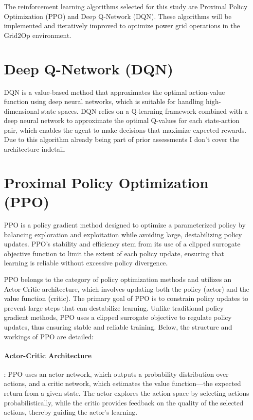\documentclass[
12pt, %
oneside, %
english, %
onehalfspacing, %
nolistspacing, %
liststotoc, %
headsepline, %
]{ProposalAndThesis} %
\begin{document}
The reinforcement learning algorithms selected for this study are Proximal Policy Optimization (PPO) and Deep Q-Network (DQN). These algorithms will be implemented and iteratively improved to optimize power grid operations in the Grid2Op environment.

\section{Deep Q-Network (DQN)}
DQN is a value-based method that approximates the optimal action-value function using deep neural networks, which is suitable for handling high-dimensional state spaces. DQN relies on a Q-learning framework combined with a deep neural network to approximate the optimal Q-values for each state-action pair, which enables the agent to make decisions that maximize expected rewards. Due to this algorithm already being part of prior assessments I don't cover the architecture indetail.

\section{Proximal Policy Optimization (PPO)}
PPO is a policy gradient method designed to optimize a parameterized policy by balancing exploration and exploitation while avoiding large, destabilizing policy updates. PPO's stability and efficiency stem from its use of a clipped surrogate objective function to limit the extent of each policy update, ensuring that learning is reliable without excessive policy divergence.

PPO belongs to the category of policy optimization methods and utilizes an Actor-Critic architecture, which involves updating both the policy (actor) and the value function (critic). The primary goal of PPO is to constrain policy updates to prevent large steps that can destabilize learning. Unlike traditional policy gradient methods, PPO uses a clipped surrogate objective to regulate policy updates, thus ensuring stable and reliable training. Below, the structure and workings of PPO are detailed:

\paragraph{Actor-Critic Architecture}: PPO uses an actor network, which outputs a probability distribution over actions, and a critic network, which estimates the value function—the expected return from a given state. The actor explores the action space by selecting actions probabilistically, while the critic provides feedback on the quality of the selected actions, thereby guiding the actor's learning.
\end{document}
